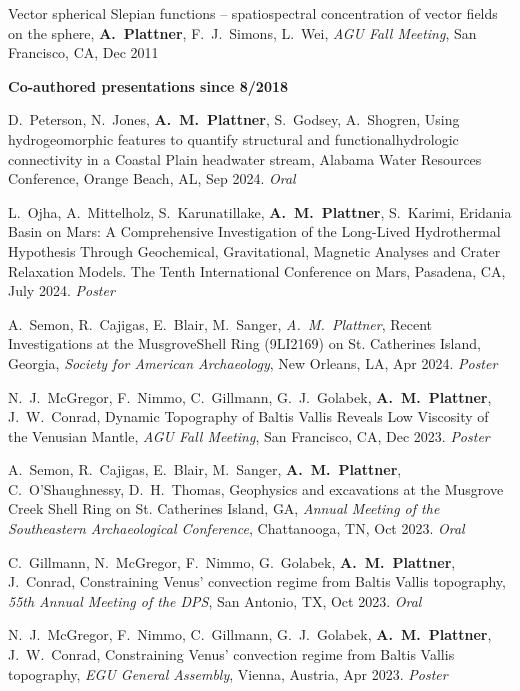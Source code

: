 \documentclass[10pt]{article}
\begin{document}
\spcp
Vector spherical Slepian functions -- spatiospectral concentration of vector fields on the sphere,
\textbf{A.~Plattner}, F.~J.~Simons, L.~Wei,
\emph{AGU Fall Meeting}, San Francisco, CA, Dec 2011


\spc
\textbf{\tsize Co-authored presentations since 8/2018}


\spcp D.\ Peterson, N.\ Jones, \textbf{A.\ M.\ Plattner}, S.\ Godsey, A.\ Shogren, Using hydrogeomorphic features to quantify structural and functionalhydrologic connectivity in a Coastal Plain headwater stream, Alabama Water Resources Conference, Orange Beach, AL, Sep 2024. \emph{Oral}

\spcp
L.\ Ojha, A.\ Mittelholz, S.\ Karunatillake, \textbf{A.\ M.\ Plattner}, S.\ Karimi, Eridania Basin on Mars: A Comprehensive Investigation of the Long-Lived Hydrothermal Hypothesis Through Geochemical, Gravitational, Magnetic Analyses and Crater Relaxation Models. The Tenth International Conference on Mars, Pasadena, CA, July 2024. \emph{Poster}

\spcp A.\ Semon, R.\ Cajigas, E.\ Blair, M.\ Sanger, \emph{A.\ M.\ Plattner}, Recent Investigations at the MusgroveShell Ring (9LI2169) on St. Catherines Island, Georgia, \emph{Society for American Archaeology}, New Orleans, LA, Apr 2024. \emph{Poster}

\spcp N.~J.~McGregor, F.~Nimmo, C.~Gillmann, G.~J.~Golabek, \textbf{A.~M.~Plattner}, J.~W.~Conrad, Dynamic Topography of Baltis Vallis Reveals Low Viscosity of the Venusian Mantle, \emph{AGU Fall Meeting}, San Francisco, CA, Dec 2023. \emph{Poster}

\spcp
A.~Semon, R.~Cajigas, E.~Blair, M.~Sanger, \textbf{A.~M.~Plattner}, C.~O'Shaughnessy, D.~H.~Thomas, Geophysics and excavations at the Musgrove Creek Shell Ring on St. Catherines Island, GA, \emph{Annual Meeting of the Southeastern Archaeological Conference}, Chattanooga, TN, Oct 2023. \emph{Oral}

\spcp C.~Gillmann, N.~McGregor, F.~Nimmo, G.~Golabek, \textbf{A.~M.~Plattner}, J.~Conrad, Constraining Venus' convection regime from Baltis Vallis topography, \emph{55th Annual Meeting of the DPS}, San Antonio, TX, Oct 2023. \emph{Oral}

\spcp N.~J.~McGregor, F.~Nimmo, C.~Gillmann, G.~J.~Golabek, \textbf{A.~M.~Plattner}, J.~W.~Conrad, Constraining Venus' convection regime from Baltis Vallis topography, \emph{EGU General Assembly}, Vienna, Austria, Apr 2023. \emph{Poster}
\end{document}
